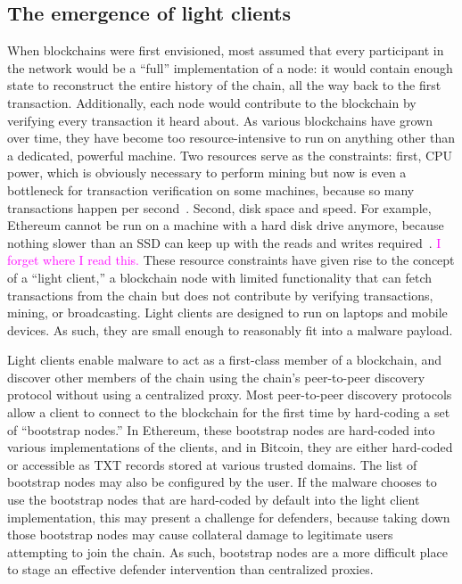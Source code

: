 \documentclass[conference]{IEEEtran}
\newcommand{\randall}{\ding{110}\ding{43}\textcolor{magenta}}
\newcommand{\randall}{}
\begin{document}
\subsection{The emergence of light clients}

When blockchains were first envisioned, most assumed that every participant in 
the network would be a ``full'' implementation of a node: it would contain 
enough state to reconstruct the entire history of the chain, all the way back 
to the first transaction. Additionally, each node would contribute to the 
blockchain by verifying every transaction it heard about. As various 
blockchains have grown over time, they have become too resource-intensive to 
run on anything other than a dedicated, powerful machine. Two 
resources serve as 
the constraints: first, CPU power, which is obviously necessary to perform 
mining but now is even a bottleneck for transaction verification on some 
machines, because so many transactions happen per 
second~\cite{citation_needed}. Second, disk 
space and speed. For example, Ethereum cannot be run on a machine with a hard 
disk drive anymore, because nothing slower than an SSD can keep up with the 
reads and writes required~\cite{citation_needed}. \randall{I 
forget where I read this.} These resource constraints have 
given rise to the concept of a ``light client,'' a blockchain 
node with limited functionality that can fetch transactions 
from the chain but does not contribute by verifying 
transactions, mining, or broadcasting. Light clients are 
designed to run on laptops and mobile devices. As 
such, they are small enough to reasonably fit into a malware 
payload. 

Light clients enable malware to act as a first-class member 
of a blockchain, and discover other members of the chain 
using the chain's peer-to-peer discovery protocol without 
using a centralized proxy. Most peer-to-peer discovery 
protocols allow a client to connect to the blockchain for the 
first time by hard-coding a set of ``bootstrap nodes.'' In 
Ethereum, these bootstrap nodes are hard-coded into various 
implementations of the clients, and in Bitcoin, they are 
either hard-coded or accessible as TXT records stored at 
various trusted domains. The list of bootstrap nodes may also 
be configured by the user. If the 
malware chooses to use the bootstrap nodes that are 
hard-coded by default into the light client implementation, 
this may present a challenge for defenders, because taking 
down those bootstrap nodes may cause collateral damage to 
legitimate users attempting to join the chain. As such, 
bootstrap nodes are a more difficult place to stage an 
effective defender intervention than centralized proxies. 
\end{document}
